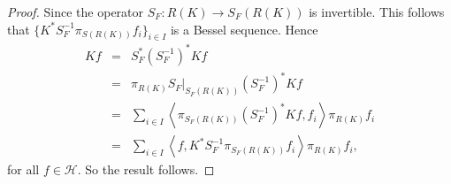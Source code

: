 \documentclass{birkjour}
\theoremstyle{definition}
\theoremstyle{remark}
\numberwithin{equation}{section}
\begin{document}
\begin{proof}
Since the operator $S_{F}:R(K)\rightarrow S_{F}(R(K))$ is invertible. This follows that $\{ K^{*}S_{F}^{-1}\pi_{S(R(K))}f_{i} \}_{i\in I}$ is a Bessel sequence. Hence
\begin{eqnarray*}
Kf 
&=& S_{F}^{*}(S_{F}^{-1})^{*}Kf\\
&=&\pi_{R(K)}S_{F}\vert_{S_{F}(R(K))}(S_{F}^{-1})^{*}Kf \\
&=&\sum_{i\in I} \left\langle \pi_{S_{F}(R(K))}(S_{F}^{-1})^{*}Kf, f_{i}\right\rangle \pi_{R(K)}f_{i}\\
&=& \sum_{i\in I} \left\langle f, K^{*}S_{F}^{-1}\pi_{S_{F}(R(K))}f_{i}\right\rangle \pi_{R(K)}f_{i},
\end{eqnarray*}
for all $f\in \mathcal{H}$. So the result follows.
\end{proof}
\end{document}
